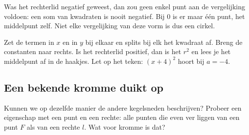 
Was het rechterlid negatief geweest, dan zou geen enkel punt aan de vergelijking voldoen: een som van kwadraten is nooit negatief. Bij 0 is er maar één punt, het middelpunt zelf. Niet elke vergelijking van deze vorm is dus een cirkel.

\begin{werkwijze}
Zet de termen in $x$ en in $y$ bij elkaar en splits bij elk het kwadraat af. Breng de constanten naar rechts. Is het rechterlid positief, dan is het $r^2$ en lees je het middelpunt af in de haakjes. Let op het teken: $(x + 4)^2$ hoort bij $a = -4$.
\end{werkwijze}


\begin{oefeningen}
\end{oefeningen}

\subsection{Een bekende kromme duikt op}

Kunnen we op dezelfde manier de andere kegelsneden beschrijven? Probeer een eigenschap met een punt en een rechte: alle punten die even ver liggen van een punt $F$ als van een rechte $l$. Wat voor kromme is dat?

